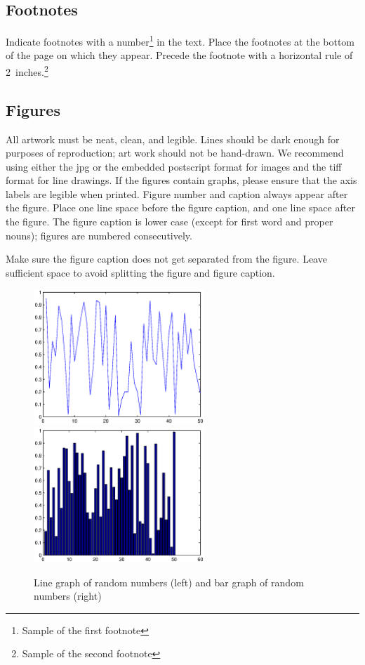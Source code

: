 \documentclass{article}
\begin{document}
\subsection{Footnotes}

Indicate footnotes with a number\footnote{Sample of the first
footnote} in the text. Place the footnotes at the bottom of the page
on which they appear. Precede the footnote with a horizontal rule of
2~inches.\footnote{Sample of the second footnote}

\subsection{Figures}

All artwork must be neat, clean, and legible. Lines should be dark
enough for purposes of reproduction; art work should not be
hand-drawn. We recommend using either the jpg or the embedded
postscript format for images and the tiff format for line drawings.
If the figures contain graphs, please ensure that the axis labels
are legible when printed. Figure number and caption always appear
after the figure. Place one line space before the figure caption,
and one line space after the figure. The figure caption is lower
case (except for first word and proper nouns); figures are numbered
consecutively.

Make sure the figure caption does not get separated from the figure.
Leave sufficient space to avoid splitting the figure and figure caption.

\begin{figure} [h]
    \centering
    \includegraphics[height=2.0in]{g1}
    \hspace{.2in}
    \includegraphics[height=2.0in]{g2}
    \caption{Line graph of random numbers (left) and bar graph of random numbers (right)}
    \label{fig:sampleFigure}
\end{figure}
\end{document}
